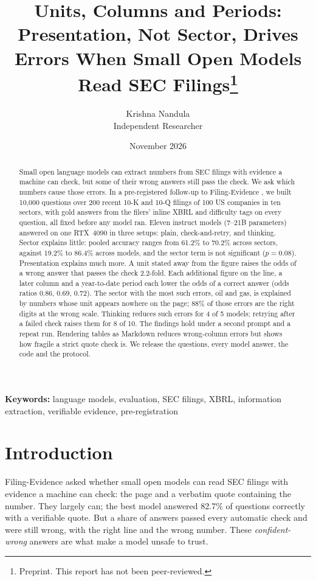 \documentclass[11pt]{article}
\title{Units, Columns and Periods: Presentation, Not Sector, Drives Errors When Small Open Models Read SEC Filings\thanks{Preprint. This report has not been peer-reviewed.}}
\author{Krishna Nandula\\Independent Researcher}
\date{November 2026}
\begin{document}
\maketitle

\begin{abstract}
Small open language models can extract numbers from SEC filings with evidence a machine can check, but some of their wrong answers still pass the check. We ask which numbers cause those errors. In a pre-registered follow-up to Filing-Evidence \citep{nandula2026filingevidence}, we built 10{,}000 questions over 200 recent 10-K and 10-Q filings of 100 US companies in ten sectors, with gold answers from the filers' inline XBRL and difficulty tags on every question, all fixed before any model ran. Eleven instruct models (7--21B parameters) answered on one RTX~4090 in three setups: plain, check-and-retry, and thinking. Sector explains little: pooled accuracy ranges from 61.2\% to 70.2\% across sectors, against 19.2\% to 86.4\% across models, and the sector term is not significant ($p = 0.08$). Presentation explains much more. A unit stated away from the figure raises the odds of a wrong answer that passes the check 2.2-fold. Each additional figure on the line, a later column and a year-to-date period each lower the odds of a correct answer (odds ratios 0.86, 0.69, 0.72). The sector with the most such errors, oil and gas, is explained by numbers whose unit appears nowhere on the page; 88\% of those errors are the right digits at the wrong scale. Thinking reduces such errors for 4 of 5 models; retrying after a failed check raises them for 8 of 10. The findings hold under a second prompt and a repeat run. Rendering tables as Markdown reduces wrong-column errors but shows how fragile a strict quote check is. We release the questions, every model answer, the code and the protocol.
\end{abstract}

\noindent\textbf{Keywords:} language models, evaluation, SEC filings, XBRL, information extraction, verifiable evidence, pre-registration

\section{Introduction}
Filing-Evidence \citep{nandula2026filingevidence} asked whether small open models can read SEC filings with evidence a machine can check: the page and a verbatim quote containing the number. They largely can; the best model answered 82.7\% of questions correctly with a verifiable quote. But a share of answers passed every automatic check and were still wrong, with the right line and the wrong number. These \emph{confident-wrong} answers are what make a model unsafe to trust.
\end{document}
